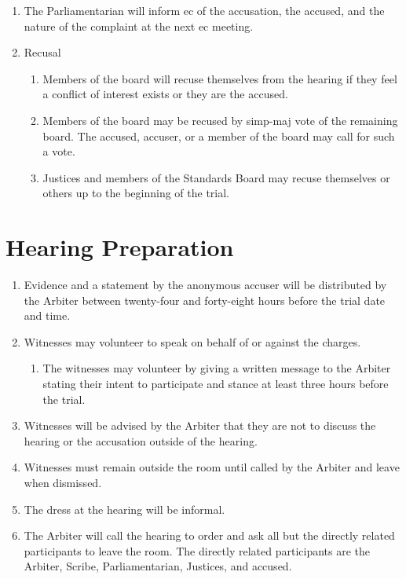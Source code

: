 \begin{enumerate}
		\item The Parliamentarian will inform \gls{ec} of the accusation, the accused, and the nature of the complaint at the next \gls{ec} meeting.

		\item Recusal
			\begin{enumerate}
				\item Members of the board will recuse themselves from the hearing if they feel a conflict of interest exists or they are the accused.
				\item Members of the board may be recused by \gls{simp-maj} vote of the remaining board. The accused, accuser, or a member of the board may call for such a vote.
				\item Justices and members of the Standards Board may recuse themselves or others up to the beginning of the trial.
			\end{enumerate}

	\end{enumerate}

\section{Hearing Preparation}
	
	\begin{enumerate}
		\item Evidence and a statement by the anonymous accuser will be distributed by the Arbiter between twenty-four and forty-eight hours before the trial date and time.
		\item Witnesses may volunteer to speak on behalf of or against the charges.
			\begin{enumerate}
				\item The witnesses may volunteer by giving a written message to the Arbiter stating their intent to participate and stance at least three hours before the trial.
			\end{enumerate}
		\item Witnesses will be advised by the Arbiter that they are not to discuss the hearing or the accusation outside of the hearing.
		\item Witnesses must remain outside the room until called by the Arbiter and leave when dismissed.
		\item The dress at the hearing will be informal.
		\item The Arbiter will call the hearing to order and ask all but the directly related participants to leave the room. The directly related participants are the Arbiter, Scribe, Parliamentarian, Justices, and accused.
	\end{enumerate}

